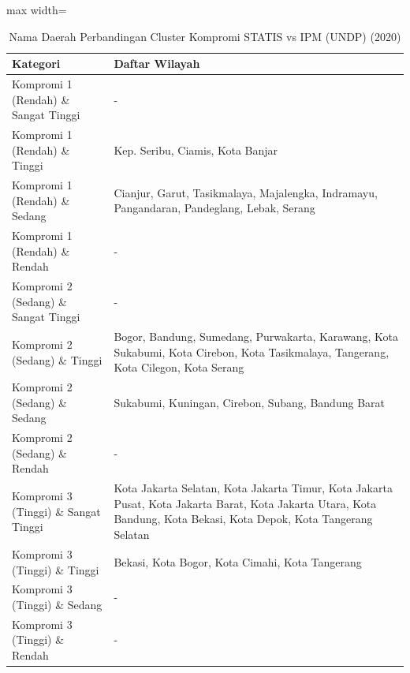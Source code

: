 \begin{table}[H]
\centering
\caption{Nama Daerah Perbandingan Cluster Kompromi STATIS vs IPM (UNDP) (2020)} \label{tab:app1comp_ipm_name_2020}
\begin{adjustbox}{max width=\textwidth}
\begin{tabular}{|p{4cm}|p{10cm}|}
\hline
\textbf{Kategori} & \textbf{Daftar Wilayah} \\
\hline
Kompromi 1 (Rendah) \& Sangat Tinggi & - \\
\hline
Kompromi 1 (Rendah) \& Tinggi & Kep. Seribu, Ciamis, Kota Banjar \\
\hline
Kompromi 1 (Rendah) \& Sedang & Cianjur, Garut, Tasikmalaya, Majalengka, Indramayu, Pangandaran, Pandeglang, Lebak, Serang \\
\hline
Kompromi 1 (Rendah) \& Rendah & - \\
\hline
Kompromi 2 (Sedang) \& Sangat Tinggi & - \\
\hline
Kompromi 2 (Sedang) \& Tinggi & Bogor, Bandung, Sumedang, Purwakarta, Karawang, Kota Sukabumi, Kota Cirebon, Kota Tasikmalaya, Tangerang, Kota Cilegon, Kota Serang \\
\hline
Kompromi 2 (Sedang) \& Sedang & Sukabumi, Kuningan, Cirebon, Subang, Bandung Barat \\
\hline
Kompromi 2 (Sedang) \& Rendah & - \\
\hline
Kompromi 3 (Tinggi) \& Sangat Tinggi & Kota Jakarta Selatan, Kota Jakarta Timur, Kota Jakarta Pusat, Kota Jakarta Barat, Kota Jakarta Utara, Kota Bandung, Kota Bekasi, Kota Depok, Kota Tangerang Selatan \\
\hline
Kompromi 3 (Tinggi) \& Tinggi & Bekasi, Kota Bogor, Kota Cimahi, Kota Tangerang \\
\hline
Kompromi 3 (Tinggi) \& Sedang & - \\
\hline
Kompromi 3 (Tinggi) \& Rendah & - \\
\hline
\end{tabular}
\end{adjustbox}
\end{table}